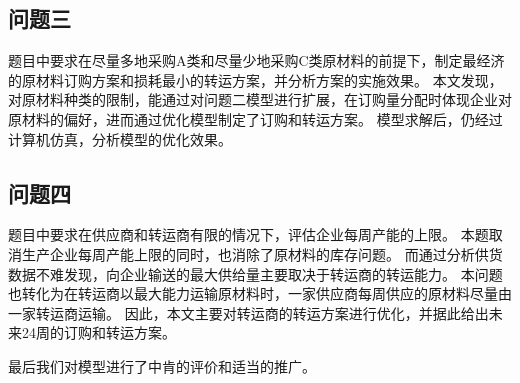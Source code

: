 \subsection{问题三}
题目中要求在尽量多地采购A类和尽量少地采购C类原材料的前提下，制定最经济的原材料订购方案和损耗最小的转运方案，并分析方案的实施效果。
本文发现，对原材料种类的限制，能通过对问题二模型进行扩展，在订购量分配时体现企业对原材料的偏好，进而通过优化模型制定了订购和转运方案。
模型求解后，仍经过计算机仿真，分析模型的优化效果。

\subsection{问题四}
题目中要求在供应商和转运商有限的情况下，评估企业每周产能的上限。
本题取消生产企业每周产能上限的同时，也消除了原材料的库存问题。
而通过分析供货数据不难发现，向企业输送的最大供给量主要取决于转运商的转运能力。
本问题也转化为在转运商以最大能力运输原材料时，一家供应商每周供应的原材料尽量由一家转运商运输。
因此，本文主要对转运商的转运方案进行优化，并据此给出未来24周的订购和转运方案。

最后我们对模型进行了中肯的评价和适当的推广。
